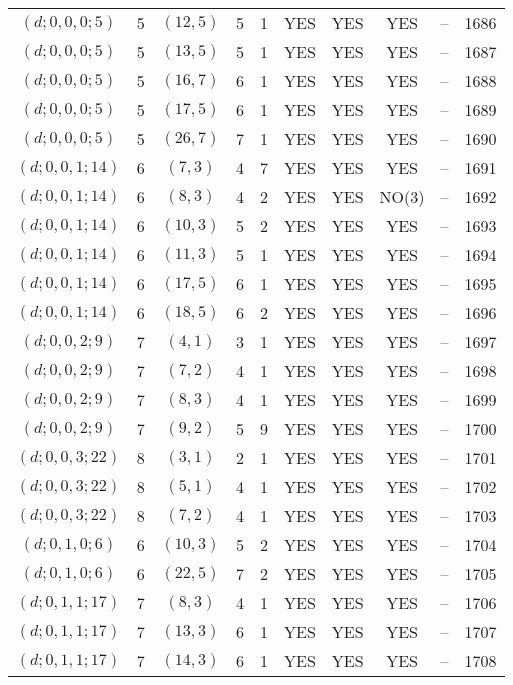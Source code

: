 \begin{longtable}{|c|c|c|c|c|c|c|c|c|c|}
$(d; 0, 0, 0; 5)$ & 5 & $(12, 5)$ & 5 & 1 & YES & YES & YES & -- & 1686\\
$(d; 0, 0, 0; 5)$ & 5 & $(13, 5)$ & 5 & 1 & YES & YES & YES & -- & 1687\\
$(d; 0, 0, 0; 5)$ & 5 & $(16, 7)$ & 6 & 1 & YES & YES & YES & -- & 1688\\
$(d; 0, 0, 0; 5)$ & 5 & $(17, 5)$ & 6 & 1 & YES & YES & YES & -- & 1689\\
$(d; 0, 0, 0; 5)$ & 5 & $(26, 7)$ & 7 & 1 & YES & YES & YES & -- & 1690\\
$(d; 0, 0, 1; 14)$ & 6 & $(7, 3)$ & 4 & 7 & YES & YES & YES & -- & 1691\\
$(d; 0, 0, 1; 14)$ & 6 & $(8, 3)$ & 4 & 2 & YES & YES & NO(3) & -- & 1692\\
$(d; 0, 0, 1; 14)$ & 6 & $(10, 3)$ & 5 & 2 & YES & YES & YES & -- & 1693\\
$(d; 0, 0, 1; 14)$ & 6 & $(11, 3)$ & 5 & 1 & YES & YES & YES & -- & 1694\\
$(d; 0, 0, 1; 14)$ & 6 & $(17, 5)$ & 6 & 1 & YES & YES & YES & -- & 1695\\
$(d; 0, 0, 1; 14)$ & 6 & $(18, 5)$ & 6 & 2 & YES & YES & YES & -- & 1696\\
$(d; 0, 0, 2; 9)$ & 7 & $(4, 1)$ & 3 & 1 & YES & YES & YES & -- & 1697\\
$(d; 0, 0, 2; 9)$ & 7 & $(7, 2)$ & 4 & 1 & YES & YES & YES & -- & 1698\\
$(d; 0, 0, 2; 9)$ & 7 & $(8, 3)$ & 4 & 1 & YES & YES & YES & -- & 1699\\
$(d; 0, 0, 2; 9)$ & 7 & $(9, 2)$ & 5 & 9 & YES & YES & YES & -- & 1700\\
$(d; 0, 0, 3; 22)$ & 8 & $(3, 1)$ & 2 & 1 & YES & YES & YES & -- & 1701\\
$(d; 0, 0, 3; 22)$ & 8 & $(5, 1)$ & 4 & 1 & YES & YES & YES & -- & 1702\\
$(d; 0, 0, 3; 22)$ & 8 & $(7, 2)$ & 4 & 1 & YES & YES & YES & -- & 1703\\
$(d; 0, 1, 0; 6)$ & 6 & $(10, 3)$ & 5 & 2 & YES & YES & YES & -- & 1704\\
$(d; 0, 1, 0; 6)$ & 6 & $(22, 5)$ & 7 & 2 & YES & YES & YES & -- & 1705\\
$(d; 0, 1, 1; 17)$ & 7 & $(8, 3)$ & 4 & 1 & YES & YES & YES & -- & 1706\\
$(d; 0, 1, 1; 17)$ & 7 & $(13, 3)$ & 6 & 1 & YES & YES & YES & -- & 1707\\
$(d; 0, 1, 1; 17)$ & 7 & $(14, 3)$ & 6 & 1 & YES & YES & YES & -- & 1708\\

\end{longtable}
